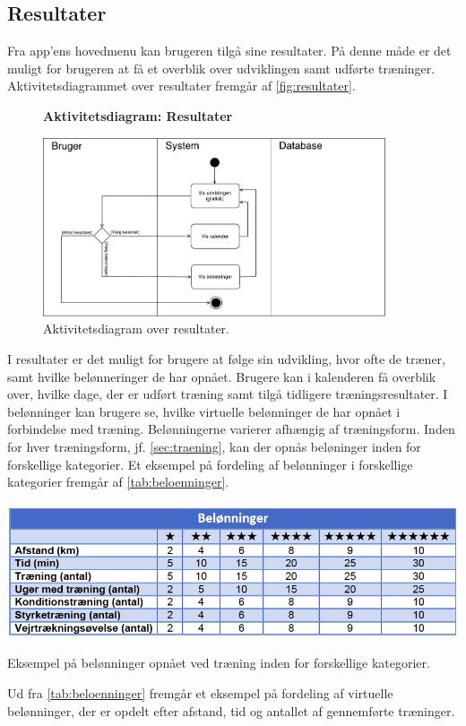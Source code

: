 \subsection*{Resultater}
Fra app'ens hovedmenu kan brugeren tilgå sine resultater. På denne måde er det muligt for brugeren at få et overblik over udviklingen samt udførte træninger.
Aktivitetsdiagrammet over resultater fremgår af \autoref{fig:resultater}.

\begin{figure} [H]
\centering
\textbf{Aktivitetsdiagram: Resultater}\par\medskip
\includegraphics[width=0.9\textwidth]{figures/aktivitetsdiagram/Resultater}
\caption{Aktivitetsdiagram over resultater.}
\label{fig:resultater}
\end{figure}

\noindent
I resultater er det muligt for brugere at følge sin udvikling, hvor ofte de træner, samt hvilke belønneringer de har opnået. 
Brugere kan i kalenderen få overblik over, hvilke dage, der er udført træning samt tilgå tidligere træningsresultater. I belønninger kan brugere se, hvilke virtuelle belønninger de har opnået i forbindelse med træning. Belønningerne varierer afhængig af træningsform. Inden for hver træningsform, jf. \autoref{sec:traening}, kan der opnås beløninger inden for forskellige kategorier. Et eksempel på fordeling af belønninger i forskellige kategorier fremgår af \autoref{tab:beloenninger}.

\begin{table} [H]
\centering
\includegraphics[width=1\textwidth]{figures/aktivitetsdiagram/beloeninnger}
\caption{Eksempel på belønninger opnået ved træning inden for forskellige kategorier.}
\label{tab:beloenninger}
\end{table}

\noindent
Ud fra \autoref{tab:beloenninger} fremgår et eksempel på fordeling af virtuelle belønninger, der er opdelt efter afstand, tid og antallet af gennemførte træninger. 
